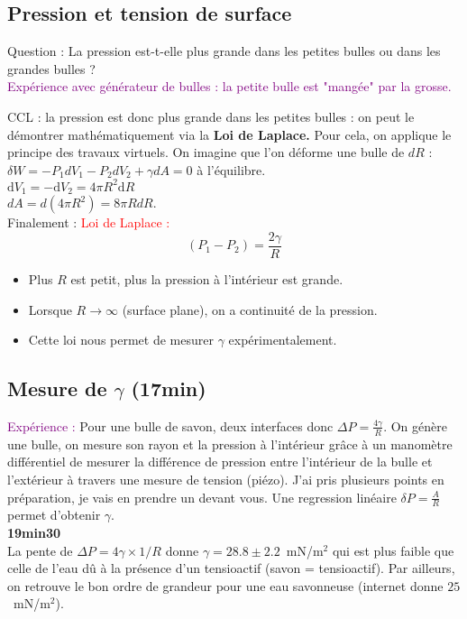 \documentclass[11pt]{report}
\numberwithin{figure}{section}
\numberwithin{equation}{section}
\numberwithin{table}{section}
\newcommand{\ud}{\mathrm{d}}
\newcommand{\1}{\boldsymbol{1}}
\begin{document}
 \subsection{Pression et tension de surface}
 Question : La pression est-t-elle plus grande dans les petites bulles ou dans les grandes bulles ? \\
 \textcolor{purple}{Expérience avec générateur de bulles : la petite bulle est "mangée" par la grosse.}

CCL : la pression est donc plus grande dans les petites bulles : on peut le démontrer mathématiquement via la \textbf{Loi de Laplace.}
 Pour cela, on applique le principe des travaux virtuels. On imagine que l'on déforme une bulle de $dR$ : \\
 $\delta W = -P_1dV_1-P_2dV_2+\gamma dA =0$ à l'équilibre.\\
 $\ud V_1 = - \ud V_2 = 4 \pi R^2 \ud R$\\
 $dA = d(4\pi R^2) = 8\pi RdR$.\\
 Finalement : 
 \textcolor{red}{Loi de Laplace : }
 \begin{equation}
     (P_1-P_2)=\frac{2\gamma}{R}
 \end{equation}
 \begin{itemize}
     \item Plus $R$ est petit, plus la pression à l'intérieur est grande. 
     \item Lorsque $R \rightarrow \infty$ (surface plane), on a continuité de la pression.
     \item Cette loi nous permet de mesurer $\gamma$ expérimentalement.
 \end{itemize}
 \subsection{Mesure de $\gamma$ (17min)}
 \textcolor{purple}{Expérience :}  Pour une bulle de savon, deux interfaces donc $\Delta P =\frac{4\gamma}{R}$. On génère une bulle, on mesure son rayon et la pression à l'intérieur grâce à un manomètre différentiel de mesurer la différence de pression entre l'intérieur de la bulle et l'extérieur à travers une mesure de tension (piézo). J'ai pris plusieurs points en préparation, je vais en prendre un devant vous. Une regression linéaire $\delta P = \frac{A}{R}$ permet d'obtenir $\gamma$. \\
 \textbf{19min30}\\

La pente de $\Delta P = 4 \gamma\times 1/R$ donne $\gamma=28.8 \pm 2.2$~mN/m$^2$ qui est plus faible que celle de l'eau dû à la présence d'un tensioactif (savon = tensioactif). Par ailleurs, on retrouve le bon ordre de grandeur pour une eau savonneuse (internet donne $25$~mN/m$^2$). \\
\end{document}
